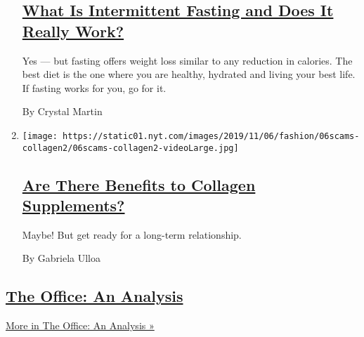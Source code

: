 \begin{enumerate}
  \hypertarget{what-is-intermittent-fasting-and-does-it-really-work}{%
  \subsection{\texorpdfstring{\href{/2019/11/23/style/self-care/intermittent-fasting-benefits.html}{What
  Is Intermittent Fasting and Does It Really
  Work?}}{What Is Intermittent Fasting and Does It Really Work?}}\label{what-is-intermittent-fasting-and-does-it-really-work}}

  Yes --- but fasting offers weight loss similar to any reduction in
  calories. The best diet is the one where you are healthy, hydrated and
  living your best life. If fasting works for you, go for it.

  By Crystal Martin
\item
  \texttt{[image: https://static01.nyt.com/images/2019/11/06/fashion/06scams-collagen2/06scams-collagen2-videoLarge.jpg]}

  \hypertarget{are-there-benefits-to-collagen-supplements}{%
  \subsection{\texorpdfstring{\href{/2019/11/09/style/self-care/collagen-benefits.html}{Are
  There Benefits to Collagen
  Supplements?}}{Are There Benefits to Collagen Supplements?}}\label{are-there-benefits-to-collagen-supplements}}

  Maybe! But get ready for a long-term relationship.

  By Gabriela Ulloa
\end{enumerate}

\hypertarget{the-office-an-analysis}{%
\subsection{\texorpdfstring{\href{/spotlight/the-office-an-analysis}{The
Office: An
Analysis}}{The Office: An Analysis}}\label{the-office-an-analysis}}

\href{/spotlight/the-office-an-analysis}{More in The Office: An Analysis
»}

